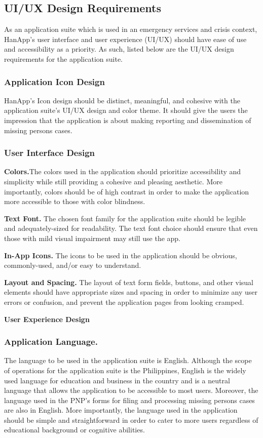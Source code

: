 \subsection{UI/UX Design Requirements}

As an application suite which is used in an emergency services and crisis context, HanApp's user interface and user experience (UI/UX) should have ease of use and accessibility as a priority. As such, listed below are the UI/UX  design requirements for the application suite.

\subsubsection{Application Icon Design}

HanApp's Icon design should be distinct, meaningful, and cohesive with the application suite's UI/UX design and color theme. It should give the users the impression that the application is about making reporting and dissemination of missing persons cases.

\subsubsection{User Interface Design}

\textbf{Colors.}The colors used in the application should prioritize accessibility and simplicity while still providing a cohesive and pleasing aesthetic. More importantly, colors should be of high contrast in order to make the application more accessible to those with color blindness.

\textbf{Text Font.} The chosen font family for the application suite should be legible and adequately-sized for readability. The text font choice should ensure that even those with mild visual impairment may still use the app.

\textbf{In-App Icons.} The icons to be used in the application should be obvious, commonly-used, and/or easy to understand.

\textbf{Layout and Spacing.} The layout of text form fields, buttons, and other visual elements should have appropriate sizes and spacing in order to minimize any user errors or confusion, and prevent the application pages from looking cramped.  

\textbf{User Experience Design}

\subsubsection{Application Language.} The language to be used in the application suite is English. Although the scope of operations for the application suite is the Philippines, English is the widely used language for education and business in the country and is a neutral language that allows the application to be accessible to most users. Moreover, the language used in the PNP's forms for filing and processing missing persons cases are also in English. More importantly, the language used in the application should be simple and straightforward in order to cater to more users regardless of educational background or cognitive abilities.

